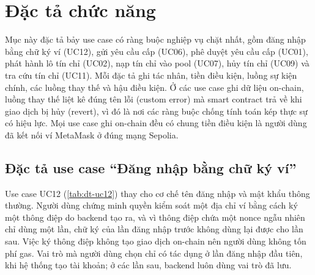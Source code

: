 \section{Đặc tả chức năng}
\label{sec:dactachucnang}

Mục này đặc tả bảy use case có ràng buộc nghiệp vụ chặt nhất, gồm đăng nhập bằng chữ ký ví (UC12), gửi yêu cầu cấp (UC06), phê duyệt yêu cầu cấp (UC01), phát hành lô tín chỉ (UC02), nạp tín chỉ vào pool (UC07), hủy tín chỉ (UC09) và tra cứu tín chỉ (UC11). Mỗi đặc tả ghi tác nhân, tiền điều kiện, luồng sự kiện chính, các luồng thay thế và hậu điều kiện. Ở các use case ghi dữ liệu on-chain, luồng thay thế liệt kê đúng tên lỗi (custom error) mà smart contract trả về khi giao dịch bị hủy (revert), vì đó là nơi các ràng buộc chống tính toán kép thực sự có hiệu lực. Mọi use case ghi on-chain đều có chung tiền điều kiện là người dùng đã kết nối ví MetaMask ở đúng mạng Sepolia.

\subsection*{Đặc tả use case ``Đăng nhập bằng chữ ký ví''}
\label{subsec:dt-uc12}

Use case UC12 (\autoref{tab:dt-uc12}) thay cho cơ chế tên đăng nhập và mật khẩu thông thường. Người dùng chứng minh quyền kiểm soát một địa chỉ ví bằng cách ký một thông điệp do backend tạo ra, và vì thông điệp chứa một nonce ngẫu nhiên chỉ dùng một lần, chữ ký của lần đăng nhập trước không dùng lại được cho lần sau. Việc ký thông điệp không tạo giao dịch on-chain nên người dùng không tốn phí gas. Vai trò mà người dùng chọn chỉ có tác dụng ở lần đăng nhập đầu tiên, khi hệ thống tạo tài khoản; ở các lần sau, backend luôn dùng vai trò đã lưu.

